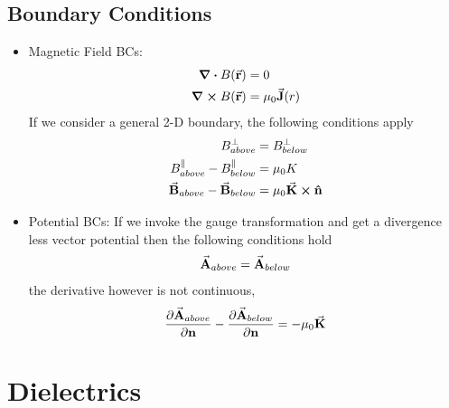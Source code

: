 \documentclass[12pt, oneside]{book}
\begin{document}
\section{Boundary Conditions}
\begin{tcolorbox}[colback=yellow!5!white,colframe=yellow!50!black]
	\begin{itemize}
	\item Magnetic Field BCs:	\begin{align}
			\div{B}(\va{r})&=0 \\
			\curl{B}(\va{r})&=\mu_0 \va{J}(r)
		\end{align}
		If we consider a general 2-D boundary, the following conditions apply
		\begin{align}
			B_{above}^{\perp}&=B_{below}^{\perp} \\
			B_{above}^{\parallel}-B_{below}^{\parallel}&=\mu_0 K \\
			\va{B}_{above}-\va{B}_{below}&=\mu_0 \va{K}\cross \vu{n}
		\end{align}
	    \end{itemize}
\end{tcolorbox}
\begin{tcolorbox}[colback=yellow!5!white,colframe=yellow!50!black]
    \begin{itemize}
	\item Potential BCs:
	If we invoke the gauge transformation and get a divergence less vector potential then the following conditions hold
	\begin{equation}
			\va{A}_{above}=\va{A}_{below}  
	\end{equation}
the derivative however is not continuous,
	\begin{equation}
		\pdv{\va{A}_{above}}{\textbf{n}}-\pdv{\va{A}_{below}}{\textbf{n}}=-\mu_0 \va{K}
	\end{equation}
	\end{itemize}
\end{tcolorbox}

\chapter{Dielectrics}
\end{document}
